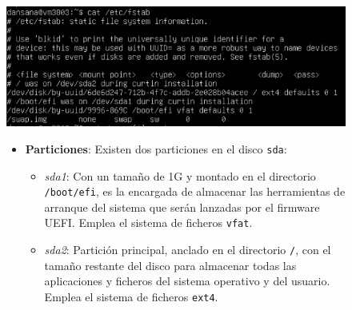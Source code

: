 \documentclass[10pt]{article}
\begin{document}
	\begin{figure}[H]
		\centering
		\begin{minipage}{0.5\textwidth}
			\centering
			\includegraphics[width=\linewidth]{Recursos/fstab.png}
		\end{minipage}\hfill
		\begin{minipage}{0.45\textwidth}
			\begin{itemize}
				\item \textbf{Particiones}: Existen dos particiones en el disco \verb|sda|:
				\begin{itemize}
					\item \textit{sda1}: Con un tamaño de 1G y montado en el directorio \verb|/boot/efi|, es la encargada de almacenar las herramientas de arranque del sistema que serán lanzadas por el firmware UEFI. Emplea el sistema de ficheros \verb|vfat|.
					\item \textit{sda2}: Partición principal, anclado en el directorio \verb|/|, con el tamaño restante del disco para almacenar todas las aplicaciones y ficheros del sistema operativo y del usuario. Emplea el sistema de ficheros \verb|ext4|.
				\end{itemize}
			\end{itemize}
		\end{minipage}
	\end{figure}
	
\end{document}
